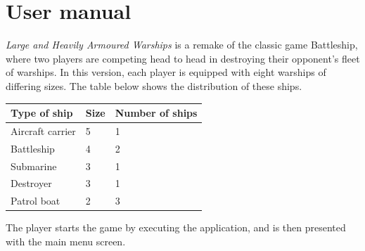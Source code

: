 \chapter{User manual}

\emph{Large and Heavily Armoured Warships} is a remake of the classic game Battleship, where two players are competing head to head in destroying their opponent's fleet of warships. In this version, each player is equipped with eight warships of differing sizes. The table below shows the distribution of these ships.

\begin{tabular}{|l|l|l|}
	\hline
	\bf{Type of ship} 	& \bf{Size} & \bf{Number of ships} \\
	\hline
	
	Aircraft carrier	& 5		& 1 \\
	Battleship 			& 4		& 2 \\
	Submarine			& 3		& 1 \\
	Destroyer			& 3		& 1 \\
	Patrol boat			& 2		& 3 \\
	\hline
\end{tabular}


The player starts the game by executing the application, and is then presented with the main menu screen.

